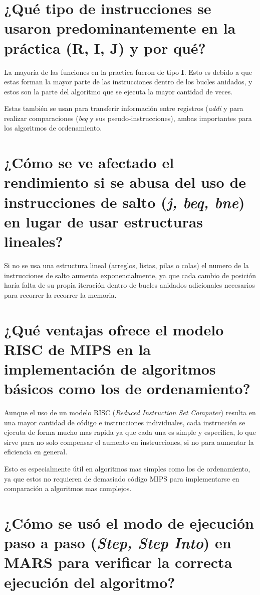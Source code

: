 \documentclass[titlepage]{article}
\begin{document}
\section*{¿Qué tipo de instrucciones se usaron predominantemente en la práctica (\textbf{R, I, J}) y por qué?}

La mayoría de las funciones en la practica fueron de tipo \textbf{I}. Esto es debido a que estas forman la mayor parte de las instrucciones dentro de los bucles anidados, y estos son la parte del algoritmo que se ejecuta la mayor cantidad de veces.

Estas también se usan para transferir información entre registros (\emph{addi} y para realizar comparaciones (\emph{beq} y sus pseudo-instrucciones), ambas importantes para los algoritmos de ordenamiento.

\section*{¿Cómo se ve afectado el rendimiento si se abusa del uso de instrucciones de salto (\emph{j, beq, bne}) en lugar de usar estructuras lineales?}

Si no se usa una estructura lineal (arreglos, listas, pilas o colas) el numero de la instrucciones de salto aumenta exponencialmente, ya que cada cambio de posición haría falta de su propia iteración dentro de bucles anidados adicionales necesarios para recorrer la recorrer la memoria.

\section*{¿Qué ventajas ofrece el modelo RISC de MIPS en la implementación de algoritmos básicos como los de ordenamiento?}

Aunque el uso de un modelo RISC (\emph{Reduced Instruction Set Computer}) resulta en una mayor cantidad de código e instrucciones individuales, cada instrucción se ejecuta de forma mucho mas rapida ya que cada una es simple y especifica, lo que sirve para no solo compensar el aumento en instrucciones, si no para aumentar la eficiencia en general.

Esto es especialmente útil en algoritmos mas simples como los de ordenamiento, ya que estos no requieren de demasiado código MIPS para implementarse en comparación a algoritmos mas complejos.

\section*{¿Cómo se usó el modo de ejecución paso a paso (\emph{Step, Step Into}) en MARS para verificar la correcta ejecución del algoritmo?}
\end{document}
